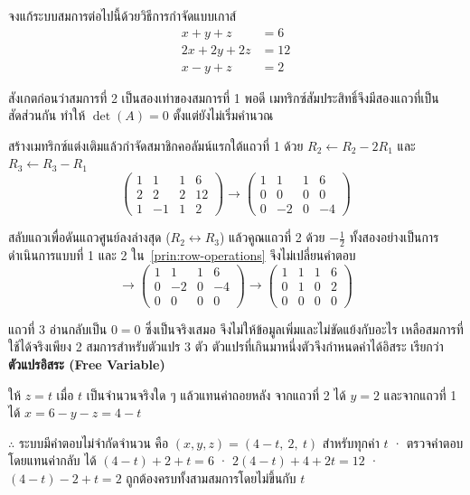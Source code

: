 \begin{ex}
\label{ex:gauss-infinite}
จงแก้ระบบสมการต่อไปนี้ด้วยวิธีการกำจัดแบบเกาส์
\[
\begin{aligned}
x + y + z &= 6 \\
2x + 2y + 2z &= 12 \\
x - y + z &= 2
\end{aligned}
\]
\end{ex}
\begin{solution}
สังเกตก่อนว่าสมการที่ 2 เป็นสองเท่าของสมการที่ 1 พอดี เมทริกซ์สัมประสิทธิ์จึงมีสองแถวที่เป็นสัดส่วนกัน ทำให้ $\det(A) = 0$ ตั้งแต่ยังไม่เริ่มคำนวณ

สร้างเมทริกซ์แต่งเติมแล้วกำจัดสมาชิกคอลัมน์แรกใต้แถวที่ 1 ด้วย $R_2 \leftarrow R_2 - 2R_1$ และ $R_3 \leftarrow R_3 - R_1$
\[ \left(\begin{array}{ccc|c} 1 & 1 & 1 & 6 \\ 2 & 2 & 2 & 12 \\ 1 & -1 & 1 & 2 \end{array}\right) \longrightarrow \left(\begin{array}{ccc|c} 1 & 1 & 1 & 6 \\ 0 & 0 & 0 & 0 \\ 0 & -2 & 0 & -4 \end{array}\right) \]

สลับแถวเพื่อดันแถวศูนย์ลงล่างสุด ($R_2 \leftrightarrow R_3$) แล้วคูณแถวที่ 2 ด้วย $-\tfrac12$ ทั้งสองอย่างเป็นการดำเนินการแบบที่ 1 และ 2 ใน~\autoref{prin:row-operations} จึงไม่เปลี่ยนคำตอบ
\[ \longrightarrow \left(\begin{array}{ccc|c} 1 & 1 & 1 & 6 \\ 0 & -2 & 0 & -4 \\ 0 & 0 & 0 & 0 \end{array}\right) \longrightarrow \left(\begin{array}{ccc|c} 1 & 1 & 1 & 6 \\ 0 & 1 & 0 & 2 \\ 0 & 0 & 0 & 0 \end{array}\right) \]

แถวที่ 3 อ่านกลับเป็น $0 = 0$ ซึ่งเป็นจริงเสมอ จึงไม่ให้ข้อมูลเพิ่มและไม่ขัดแย้งกับอะไร เหลือสมการที่ใช้ได้จริงเพียง 2 สมการสำหรับตัวแปร 3 ตัว ตัวแปรที่เกินมาหนึ่งตัวจึงกำหนดค่าได้อิสระ เรียกว่า \textbf{ตัวแปรอิสระ (Free Variable)}

ให้ $z = t$ เมื่อ $t$ เป็นจำนวนจริงใด ๆ แล้วแทนค่าถอยหลัง จากแถวที่ 2 ได้ $y = 2$ และจากแถวที่ 1 ได้ $x = 6 - y - z = 4 - t$

$\therefore$ ระบบมีคำตอบไม่จำกัดจำนวน คือ $(x, y, z) = (4 - t,\ 2,\ t)$ สำหรับทุกค่า $t$ · ตรวจคำตอบโดยแทนค่ากลับ ได้ $(4-t) + 2 + t = 6$ · $2(4-t) + 4 + 2t = 12$ · $(4-t) - 2 + t = 2$ ถูกต้องครบทั้งสามสมการโดยไม่ขึ้นกับ $t$ \solhere
\end{solution}

